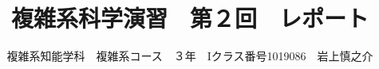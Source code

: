 \documentclass[10pt, a4paper]{jsarticle}
\title{複雑系科学演習　第２回　レポート} %
\begin{document}
\author{複雑系知能学科　複雑系コース　３年　Iクラス番号1019086　岩上慎之介}
\maketitle %
\newpage

\end{document}

